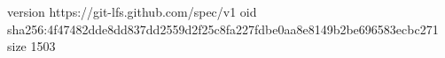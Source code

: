 version https://git-lfs.github.com/spec/v1
oid sha256:4f47482dde8dd837dd2559d2f25c8fa227fdbe0aa8e8149b2be696583ecbc271
size 1503
